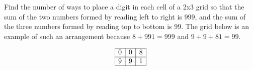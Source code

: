Find the number of ways to place a digit in each cell of a 2x3 grid so that the sum of the two numbers formed by reading left to right is $999$, and the sum of the three numbers formed by reading top to bottom is $99$. The grid below is an example of such an arrangement because $8+991=999$ and $9+9+81=99$.

$$
\begin{array}{|c|c|c|} \hline
0 & 0 & 8 \\ \hline
9 & 9 & 1 \\ \hline
\end{array}
$$
